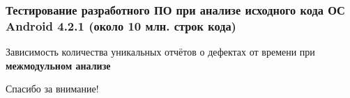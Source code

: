 \documentclass[hyperref={pdfpagelabels=false},10pt,gray]{beamer}
\begin{document}
\begin{frame}
\frametitle{Тестирование разработного ПО при анализе исходного кода ОС Android 4.2.1 (около 10 млн. строк кода)}
Зависимость количества уникальных отчётов о дефектах от времени  при \textbf{межмодульном анализе}

\begin{figure}[h]
\end{figure}
\end{frame}

\begin{frame}
\begin{center}
Спасибо за внимание!
\end{center}
\end{frame}
\end{document}
